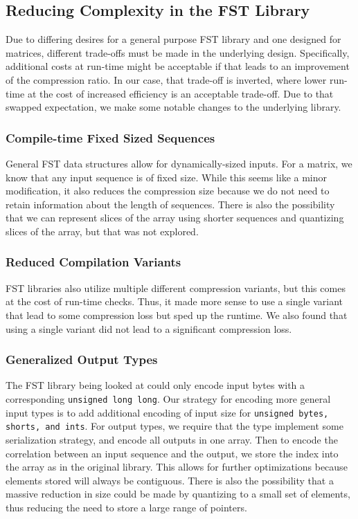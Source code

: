 \documentclass[12pt]{article}
\begin{document}
\subsection{Reducing Complexity in the FST Library}

Due to differing desires for a general purpose FST library and one designed for matrices,
different trade-offs must be made in the underlying design. Specifically, additional costs at
run-time might be acceptable if that leads to an improvement of the compression ratio. In our case,
that trade-off is inverted, where lower run-time at the cost of increased efficiency is an
acceptable trade-off. Due to that swapped expectation, we make some notable changes to the
underlying library.

\subsubsection{Compile-time Fixed Sized Sequences}
General FST data structures allow for dynamically-sized inputs. For a matrix, we know that any
input sequence is of fixed size. While this seems like a minor modification, it also reduces the
compression size because we do not need to retain information about the length of sequences.
There is also the possibility that we can represent slices of the array using shorter sequences
and quantizing slices of the array, but that was not explored.

\subsubsection{Reduced Compilation Variants}
FST libraries also utilize multiple different compression variants, but this comes at the cost
of run-time checks. Thus, it made more sense to use a single variant that lead to some
compression loss but sped up the runtime. We also found that using a single variant did not lead
to a significant compression loss.

\subsubsection{Generalized Output Types}
The FST library being looked at could only encode input bytes with a corresponding
\lstinline{unsigned long long}. Our strategy for encoding more general input types is to add
additional encoding of input size for \lstinline{unsigned bytes, shorts, and ints}. For output types, we
require that the type implement some serialization strategy, and encode all outputs in one
array. Then to encode the correlation between an input sequence and the output, we store the
index into the array as in the original library. This allows for further optimizations because
elements stored will always be contiguous. There is also the possibility that a massive
reduction in size could be made by quantizing to a small set of elements, thus reducing the need
to store a large range of pointers.
\end{document}
